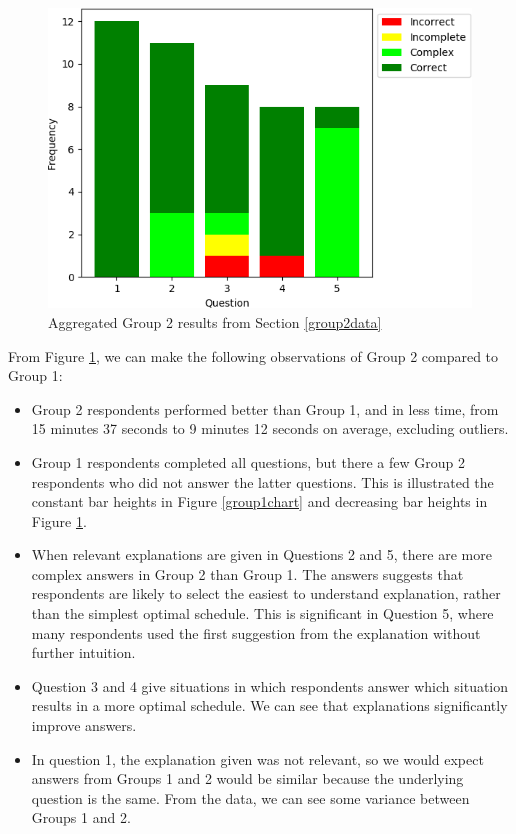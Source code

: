\begin{figure}[H]
	\begin{center}
		\includegraphics[scale=0.55]{figures/questionnaire_results_group_two}
	\end{center}
	\caption{Aggregated Group 2 results from Section \ref{group2data}}
	\label{group2chart}
\end{figure}

From Figure \ref{group2chart}, we can make the following observations of Group 2 compared to Group 1:
\begin{itemize}
	\item Group 2 respondents performed better than Group 1, and in less time, from 15 minutes 37 seconds to 9 minutes 12 seconds on average, excluding outliers.
	\item Group 1 respondents completed all questions, but there a few Group 2 respondents who did not answer the latter questions. This is illustrated the constant bar heights in Figure \ref{group1chart} and decreasing bar heights in Figure \ref{group2chart}.
	\item When relevant explanations are given in Questions 2 and 5, there are more complex answers in Group 2 than Group 1. The answers suggests that respondents are likely to select the easiest to understand explanation, rather than the simplest optimal schedule. This is significant in Question 5, where many respondents used the first suggestion from the explanation without further intuition.
	\item Question 3 and 4 give situations in which respondents answer which situation results in a more optimal schedule. We can see that explanations significantly improve answers.
	\item In question 1, the explanation given was not relevant, so we would expect answers from Groups 1 and 2 would be similar because the underlying question is the same. From the data, we can see some variance between Groups 1 and 2.
\end{itemize}

